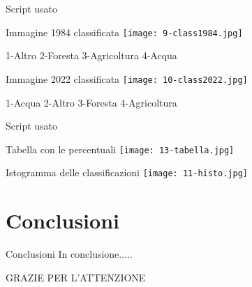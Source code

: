 \documentclass{beamer}
\begin{document}
\begin{frame}{Script usato}
    \begin{scriptsize}
        
    \end{scriptsize}
\end{frame}

\begin{frame}{Immagine 1984 classificata}
    \texttt{[image: 9-class1984.jpg]}
    \centering
    
    \medskip
    
1-Altro 2-Foresta 3-Agricoltura 4-Acqua
\end{frame}

\begin{frame}{Immagine 2022 classificata}
    \texttt{[image: 10-class2022.jpg]}
    \centering
    
    \medskip
    
    1-Acqua 2-Altro 3-Foresta 4-Agricoltura
\end{frame}

\begin{frame}{Script usato}
    \begin{tiny}
        
    \end{tiny}
\end{frame}

\begin{frame}{Tabella con le percentuali}
    \texttt{[image: 13-tabella.jpg]}
    \centering
\end{frame}

\begin{frame}{Istogramma delle classificazioni}
    \texttt{[image: 11-histo.jpg]}
    \centering
\end{frame}

\section{Conclusioni}

\begin{frame}{Conclusioni}
    In conclusione.....
\end{frame}

\begin{frame}
\begin{Huge}
GRAZIE PER L'ATTENZIONE
\end{Huge}
\end{frame}
\end{document}

